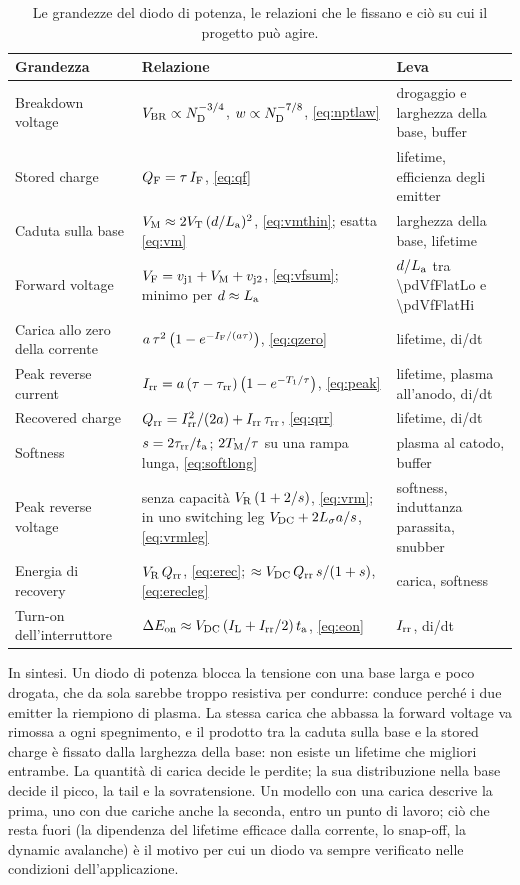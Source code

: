 \documentclass[10pt,a4paper]{scrartcl}
\let\newcommand\pdvaluedefine
\newcommand{\IF}{I_\mathrm{F}}
\newcommand{\VR}{V_\mathrm{R}}
\newcommand{\VF}{V_\mathrm{F}}
\newcommand{\Irr}{I_\mathrm{rr}}
\newcommand{\Qrr}{Q_\mathrm{rr}}
\newcommand{\ta}{t_\mathrm{a}}
\newcommand{\taurr}{\tau_\mathrm{rr}}
\newcommand{\TM}{T_\mathrm{M}}
\newcommand{\Tone}{T_1}
\newcommand{\vjo}{v_\mathrm{j1}}
\newcommand{\vjt}{v_\mathrm{j2}}
\newcommand{\VT}{V_\mathrm{T}}
\newcommand{\Ls}{L_\sigma}                    %
\newcommand{\ND}{N_\mathrm{D}}
\newcommand{\La}{L_\mathrm{a}}
\newcommand{\VM}{V_\mathrm{M}}
\newcommand{\Vbr}{V_\mathrm{BR}}
\newcommand{\Vdc}{V_\mathrm{DC}}
\newcommand{\QF}{Q_\mathrm{F}}
\begin{document}
\begin{table}[htb]
\centering\small
\caption{Le grandezze del diodo di potenza, le relazioni che le fissano e ciò su cui il progetto può agire.}
\label{tab:summary}
\begin{tabular}{@{}l>{\raggedright\arraybackslash}p{6.6cm}>{\raggedright\arraybackslash}p{5.2cm}@{}}
\toprule
Grandezza & Relazione & Leva \\
\midrule
Breakdown voltage & $\Vbr \propto \ND^{-3/4}$, $w \propto \ND^{-7/8}$, \eqref{eq:nptlaw} & drogaggio e larghezza della base, buffer \\
Stored charge & $\QF = \tau\,\IF$, \eqref{eq:qf} & lifetime, efficienza degli emitter \\
Caduta sulla base & $\VM \approx 2\VT\,(d/\La)^2$, \eqref{eq:vmthin}; esatta \eqref{eq:vm} & larghezza della base, lifetime \\
Forward voltage & $\VF = \vjo + \VM + \vjt$, \eqref{eq:vfsum}; minimo per $d \approx \La$ & $d/\La$ tra \num{\pdVfFlatLo} e \num{\pdVfFlatHi} \\
Carica allo zero della corrente & $a\,\tau^2\,\bigl(1-e^{-\IF/(a\tau)}\bigr)$, \eqref{eq:qzero} & lifetime, di/dt \\
Peak reverse current & $\Irr = a\,(\tau-\taurr)\,\bigl(1-e^{-\Tone/\tau}\bigr)$, \eqref{eq:peak} & lifetime, plasma all'anodo, di/dt \\
Recovered charge & $\Qrr = \Irr^2/(2a) + \Irr\,\taurr$, \eqref{eq:qrr} & lifetime, di/dt \\
Softness & $s = 2\taurr/\ta$; $2\TM/\tau$ su una rampa lunga, \eqref{eq:softlong} & plasma al catodo, buffer \\
Peak reverse voltage & senza capacità $\VR\,(1+2/s)$, \eqref{eq:vrm}; in uno switching leg $\Vdc + 2\Ls a/s$, \eqref{eq:vrmleg} & softness, induttanza parassita, snubber \\
Energia di recovery & $\VR\,\Qrr$, \eqref{eq:erec}; $\approx \Vdc\,\Qrr\,s/(1+s)$, \eqref{eq:erecleg} & carica, softness \\
Turn-on dell'interruttore & $\Delta E_\mathrm{on} \approx \Vdc\,(I_\mathrm{L} + \Irr/2)\,\ta$, \eqref{eq:eon} & $\Irr$, di/dt \\
\bottomrule
\end{tabular}
\end{table}

In sintesi. Un diodo di potenza blocca la tensione con una base larga e poco drogata, che da sola sarebbe troppo resistiva per condurre: conduce perché i due emitter la riempiono di plasma. La stessa carica che abbassa la forward voltage va rimossa a ogni spegnimento, e il prodotto tra la caduta sulla base e la stored charge è fissato dalla larghezza della base: non esiste un lifetime che migliori entrambe. La quantità di carica decide le perdite; la sua distribuzione nella base decide il picco, la tail e la sovratensione. Un modello con una carica descrive la prima, uno con due cariche anche la seconda, entro un punto di lavoro; ciò che resta fuori (la dipendenza del lifetime efficace dalla corrente, lo snap-off, la dynamic avalanche) è il motivo per cui un diodo va sempre verificato nelle condizioni dell'applicazione.
\appendix
\end{document}
